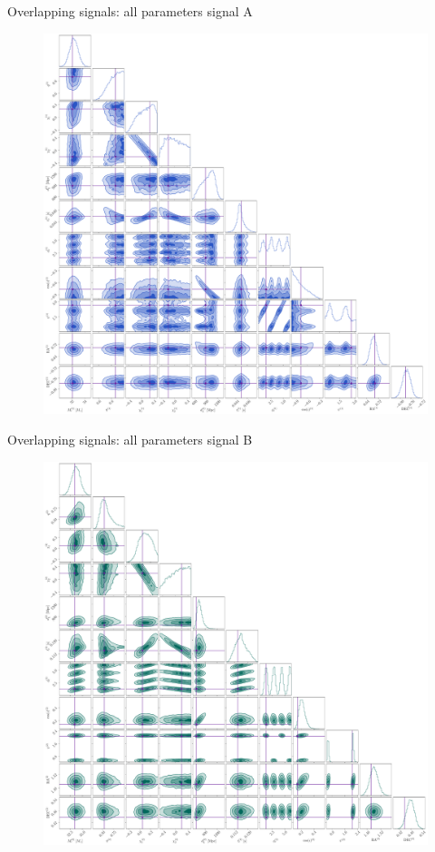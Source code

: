 \documentclass[usenames,dvipsnames,t]{beamer}
\begin{document}
\begin{frame}{Overlapping signals: all parameters signal A}
  \vspace{-3mm}
  \begin{figure}
    \centering
    \includegraphics[scale=0.1325]{Figures/OS_injection_139_v2_1_cornerplot_all.pdf}
  \end{figure}
\end{frame}

\begin{frame}{Overlapping signals: all parameters signal B}
  \vspace{-3mm}
  \begin{figure}
    \centering
    \includegraphics[scale=0.1325]{Figures/OS_injection_139_v2_2_cornerplot_all.pdf}
  \end{figure}
\end{frame}
\end{document}
